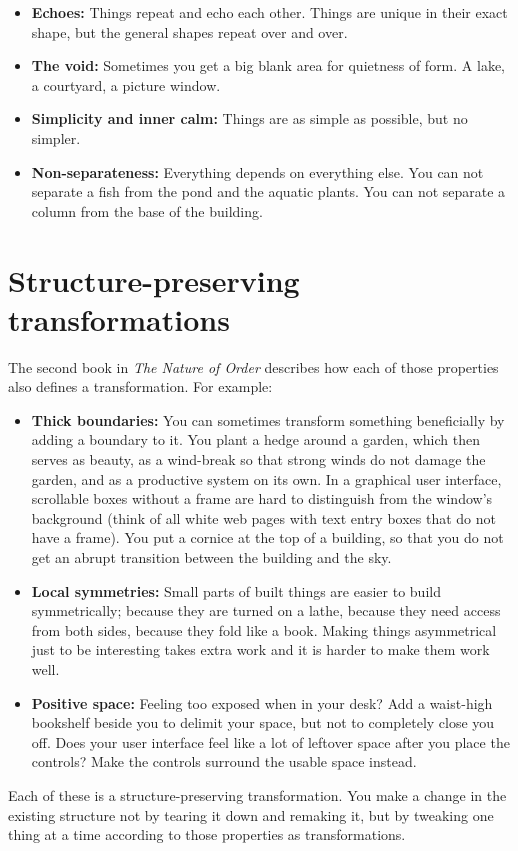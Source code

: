 \begin{itemize}
 \item \textbf{Echoes:} Things repeat and echo each other. Things are unique in their exact shape, but the general shapes repeat over and over.
 \item \textbf{The void:} Sometimes you get a big blank area for quietness of form. A lake, a courtyard, a picture window.
 \item \textbf{Simplicity and inner calm:} Things are as simple as possible, but no simpler.
 \item \textbf{Non-separateness:} Everything depends on everything else. You can not separate a fish from the pond and the aquatic plants. You can not separate a column from the base of the building.
\end{itemize}

\section*{Structure-preserving transformations}

The second book in \textit{The Nature of Order} describes how each of those properties also defines a transformation. For example:
\begin{itemize}
 \item \textbf{Thick boundaries:} You can sometimes transform something beneficially by adding a boundary to it. You plant a hedge around a garden, which then serves as beauty, as a wind-break so that strong winds do not damage the garden, and as a productive system on its own. In a graphical user interface, scrollable boxes without a frame are hard to distinguish from the window's background (think of all white web pages with text entry boxes that do not have a frame). You put a cornice at the top of a building, so that you do not get an abrupt transition between the building and the sky.
 \item \textbf{Local symmetries:} Small parts of built things are easier to build symmetrically; because they are turned on a lathe, because they need access from both sides, because they fold like a book. Making things asymmetrical just to be interesting takes extra work and it is harder to make them work well.
 \item \textbf{Positive space:} Feeling too exposed when in your desk?  Add a waist-high bookshelf beside you to delimit your space, but not to completely close you off. Does your user interface feel like a lot of leftover space after you place the controls?  Make the controls surround the usable space instead.
\end{itemize}
Each of these is a structure-preserving transformation. You make a change in the existing structure not by tearing it down and remaking it, but by tweaking one thing at a time according to those properties as transformations.

